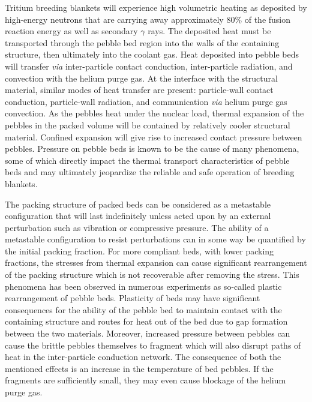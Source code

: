 
Tritium breeding blankets will experience high volumetric heating as deposited by high-energy neutrons that are carrying away approximately 80\% of the fusion reaction energy as well as secondary $\gamma$ rays. The deposited heat must be transported through the pebble bed region into the walls of the containing structure, then ultimately into the coolant gas. Heat deposited into pebble beds will transfer \textit{via} inter-particle contact conduction, inter-particle radiation, and convection with the helium purge gas. At the interface with the structural material, similar modes of heat transfer are present: particle-wall contact conduction, particle-wall radiation, and communication \textit{via} helium purge gas convection. As the pebbles heat under the nuclear load, thermal expansion of the pebbles in the packed volume will be contained by relatively cooler structural material. Confined expansion will give rise to increased contact pressure between pebbles. Pressure on pebble beds is known to be the cause of many phenomena, some of which directly impact the thermal transport characteristics of pebble beds and may ultimately jeopardize the reliable and safe operation of breeding blankets. 

The packing structure of packed beds can be considered as a metastable configuration that will last indefinitely unless acted upon by an external perturbation such as vibration or compressive pressure.\cite{Jaeger1996} The ability of a metastable configuration to resist perturbations can in some way be quantified by the initial packing fraction. For more compliant beds, with lower packing fractions, the stresses from thermal expansion can cause significant rearrangement of the packing structure which is not recoverable after removing the stress. This phenomena has been observed in numerous experiments as so-called plastic rearrangement of pebble beds.\cite{Reimann:2002kl,Reimann:2000tw,Zhang2015} Plasticity of beds may have significant consequences for the ability of the pebble bed to maintain contact with the containing structure and routes for heat out of the bed due to gap formation between the two materials. Moreover, increased pressure between pebbles can cause the brittle pebbles themselves to fragment which will also disrupt paths of heat in the inter-particle conduction network. The consequence of both the mentioned effects is an increase in the temperature of bed pebbles. If the fragments are sufficiently small, they may even cause blockage of the helium purge gas. 

